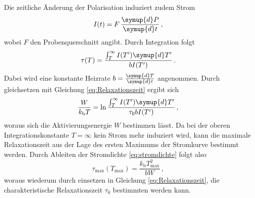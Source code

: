 Die zeitliche Änderung der Polarisation induziert zudem Strom
\begin{equation}
    I(t) = F \, \frac{\symup{d}P}{\symup{d}t} \, ,
\end{equation}
wobei $F$ den Probenquerschnitt angibt.
Durch Integration folgt 
\begin{equation}
    \tau(T) = \frac{ \int_{T}^{\infty} I(T')\symup{d}T'}{bI(T')} \, .
\end{equation}
Dabei wird eine konstante Heizrate $b = \frac{\symup{d}T}{\symup{d}t}$ angenommen.
Durch gleichsetzen mit Gleichung \eqref{eq:Relaxationszeit} ergibt sich
\begin{equation}
    \frac{W}{k_\text{b}T} = \ln \frac{ \int_{T}^{\infty} I(T')\symup{d}T'}{\tau_0 b I(T')} \, ,
    \label{eq:int}
\end{equation}
woraus sich die Aktivierungsenergie $W$ bestimmen lässt.
Da bei der oberen Integrationskonstante $T=\infty$ kein Strom mehr induziert wird, kann die maximale Relaxationszeit aus der Lage des ersten Maximums der Stromkurve bestimmt werden.
Durch Ableiten der Stromdichte \eqref{eq:stromdichte} folgt also
\begin{equation}
    \tau _\text{max}(T_\text{max}) = \frac{k_\text{b} T_\text{max} ^2}{bW} \, ,
    \label{eq:t_max}
\end{equation}
woraus wiederum durch einsetzen in Gleichung \eqref{eq:Relaxationszeit}, die charakteristische Relaxationszeit $\tau_0$ bestimmten werden kann.



